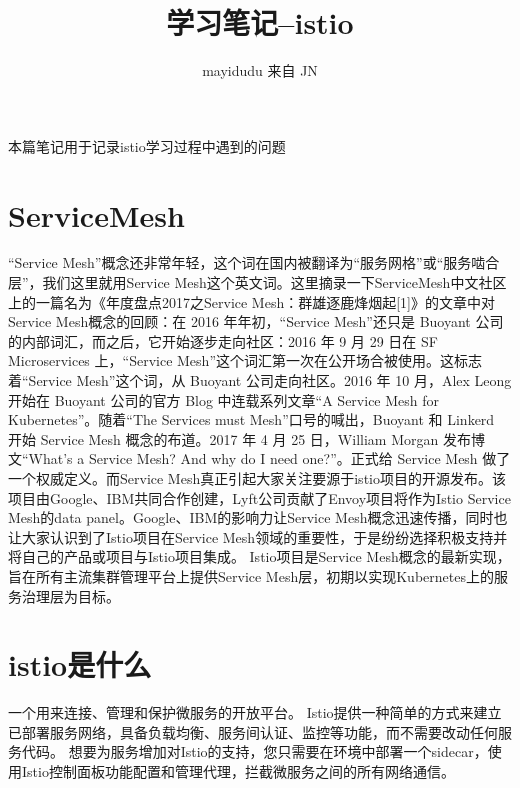 \documentclass{ctexart}
\newcommand{\jn}{JN}
\begin{document}
\title{学习笔记--istio}
\author{mayidudu 来自 \jn}
\maketitle
\tableofcontents


\begin{center}
	本篇笔记用于记录istio学习过程中遇到的问题
\end{center}
\section{ServiceMesh}
“Service Mesh”概念还非常年轻，这个词在国内被翻译为“服务网格”或“服务啮合层”，我们这里就用Service Mesh这个英文词。这里摘录一下ServiceMesh中文社区上的一篇名为《年度盘点2017之Service Mesh：群雄逐鹿烽烟起[1]》的文章中对Service Mesh概念的回顾：在 2016 年年初，“Service Mesh”还只是 Buoyant 公司的内部词汇，而之后，它开始逐步走向社区：2016 年 9 月 29 日在 SF Microservices 上，“Service Mesh”这个词汇第一次在公开场合被使用。这标志着“Service Mesh”这个词，从 Buoyant 公司走向社区。2016 年 10 月，Alex Leong 开始在 Buoyant 公司的官方 Blog 中连载系列文章“A Service Mesh for Kubernetes”。随着“The Services must Mesh”口号的喊出，Buoyant 和 Linkerd 开始 Service Mesh 概念的布道。2017 年 4 月 25 日，William Morgan 发布博文“What’s a Service Mesh? And why do I need one?”。正式给 Service Mesh 做了一个权威定义。而Service Mesh真正引起大家关注要源于istio项目的开源发布。该项目由Google、IBM共同合作创建，Lyft公司贡献了Envoy项目将作为Istio Service Mesh的data panel。Google、IBM的影响力让Service Mesh概念迅速传播，同时也让大家认识到了Istio项目在Service Mesh领域的重要性，于是纷纷选择积极支持并将自己的产品或项目与Istio项目集成。
Istio项目是Service Mesh概念的最新实现，旨在所有主流集群管理平台上提供Service Mesh层，初期以实现Kubernetes上的服务治理层为目标。

\section{istio是什么}
一个用来连接、管理和保护微服务的开放平台。 
Istio提供一种简单的方式来建立已部署服务网络，具备负载均衡、服务间认证、监控等功能，而不需要改动任何服务代码。
想要为服务增加对Istio的支持，您只需要在环境中部署一个sidecar，使用Istio控制面板功能配置和管理代理，拦截微服务之间的所有网络通信。
\end{document}
